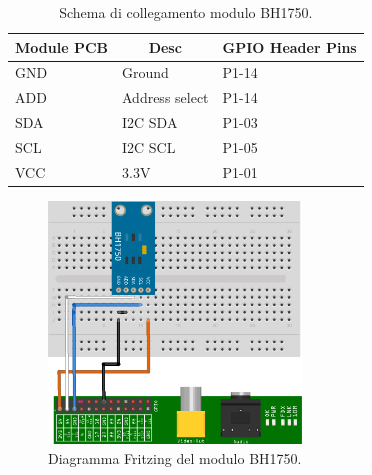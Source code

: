\begin{table}[H]
    \centering
    \begin{tabular}{|l|l|l|}
    \hline
    \multicolumn{1}{|c|}{\textbf{Module PCB}} & \multicolumn{1}{c|}{\textbf{Desc}} & \multicolumn{1}{c|}{\textbf{GPIO Header Pins}} \\ \hline
    GND                                       & Ground                             & P1-14                                          \\ \hline
    ADD                                       & Address select                     & P1-14                                          \\ \hline
    SDA                                       & I2C SDA                            & P1-03                                          \\ \hline
    SCL                                       & I2C SCL                            & P1-05                                          \\ \hline
    VCC                                       & 3.3V                               & P1-01                                          \\ \hline
    \end{tabular}
    \caption{\label{tb-BH1750-conn-schema}Schema di collegamento modulo BH1750.}
\end{table}

\begin{figure}[H]
    \begin{center}
      \includegraphics[width=0.6\textwidth]{images/sensors/BH1750-fritzing.png}
    \end{center}
    \caption{\label{bh1750-diagram}Diagramma Fritzing del modulo BH1750.}
\end{figure}

